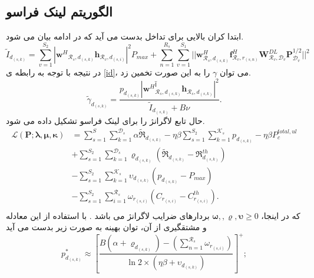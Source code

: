 \subsection{الگوریتم لینک فراسو}
 ابتدا کران بالایی برای تداخل بدست می آید که در ادامه بیان می شود.
\begin{equation} \label{id}
\tilde{I}_{d_{(s,k)}} = \sum_{v=1}^{S_2}  |{\boldsymbol{w}^H}_{\mathcal{R}_s, d_{(s,k)}} \boldsymbol{h}_{\mathcal{R}_v, d_{(s,i)}}|^2 P_{max} +\sum_{n=1}^{R_s}  \sum_{v=1}^{S_1} || \boldsymbol{w}^H_{\mathcal{R}_s, d_{(s,k)}} \boldsymbol{f}_{\mathcal{R}_v, r_{(s,n)}}^H  \boldsymbol{W}_{\mathcal{R}_v,\mathcal{D}_v}^{DL} \boldsymbol{P}_{\mathcal{D}_v}^{1/2}||^2
\end{equation}
در نتیجه با توجه به رابطه ی  \eqref{id}، می توان $\gamma$ را به این صورت تخمین زد.
\begin{equation}
\tilde{\gamma}_{d_{(s,k)}}= \frac{p_{d_{(s,k)}} |{\boldsymbol{w}^H}_{\mathcal{R}_{s},d_{(s,k)}}^آ\boldsymbol{h}_{\mathcal{R}_s, d_{(s,k)}}|^2}{\tilde{I}_{d_{(s,k)}}+B\nu}.
\end{equation}
حال تابع لاگرانژ را برای لینک فراسو تشکیل داده می شود.
\begin{equation}
\begin{split}
\mathcal{L}(\boldsymbol{P}; \boldsymbol{\lambda}, \boldsymbol{\mu}, \boldsymbol{ \kappa}) & = \sum\limits_{s=1}^{S} \sum\limits_{k=1}^{\mathcal{D}_s} \alpha \mathfrak{\tilde{R}}_{d_{(s,k)}} 
- \eta \beta \sum\limits_{s=1}^{S_2} \sum\limits_{k=1}^{\mathcal{K}_s}{p}_{d_{(s,k)}} - \eta \beta P_c^{total ,ul}\\
&+\sum\limits_{s=1}^{S_2} \sum\limits_{k=1}^{\mathcal{D}_s} {\varrho_{d_{(s,k)}}} (\mathfrak{\tilde{R}}_{d_{(s,k)}}-\mathfrak{R}_{d_{(s,k)}}^{th})\\
&- \sum\limits_{s=1}^{S_2} \sum\limits_{k=1}^{\mathcal{K}_s} {\upsilon_{d_{(s,k)}}} ({p}_{d_{(s,k)}}-P_{max})\\
&- \sum\limits_{s=1}^{S_2} \sum\limits_{i=1}^{\mathcal{R}_s} {\omega_{r_{(s,i)}}} (C_{r_{(s,i)}}-C_{r_{(s,i)}}^{th}).\\
\end{split}
\end{equation}
که در اینجا، $\boldsymbol{\omega,}, \boldsymbol{\varrho}, \boldsymbol{\upsilon} \geq 0$
بردارهای ضرایب لاگرانژ می باشد .\newline
با استفاده از این معادله و مشتقگیری از آن، توان بهینه به صورت زیر بدست می آید
\begin{equation}
p_{d_{(s,k)}}^* \approx [\frac{ B(\alpha+\varrho_{d_{(s,k)}}) -(\sum_{n=1}^{\mathcal{R}_s}\omega_{r_{(s,i)}})}{\ln2 \times (\eta \beta + \upsilon_{d_{(s,k)}})}]^+;
\end{equation} 

